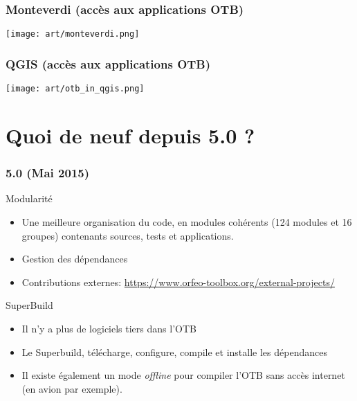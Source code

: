 \documentclass[8pt]{beamer}
\begin{document}
\begin{frame}
\frametitle{Monteverdi (accès aux applications OTB)}
\begin{minipage}[t][6cm][t]{\textwidth}
\begin{center}
\texttt{[image: art/monteverdi.png]}
\end{center}
\end{minipage}
\end{frame}

\begin{frame}
  \frametitle{QGIS (accès aux applications OTB)}
\begin{minipage}[t][6cm][t]{\textwidth}
\begin{center}
\texttt{[image: art/otb\_in\_qgis.png]}
\end{center}
\end{minipage}
\end{frame}

\section{Quoi de neuf depuis 5.0 ?}

\begin{frame}
\frametitle{5.0 (Mai 2015)}
\begin{block}{Modularité}
\begin{itemize}
\item Une meilleure organisation du code, en modules cohérents (124 modules et
    16 groupes) contenants sources, tests et applications.
\item Gestion des dépendances
\item Contributions externes: \url{https://www.orfeo-toolbox.org/external-projects/}
\end{itemize}
\end{block}

\begin{block}{SuperBuild}
\begin{itemize}
\item Il n'y a plus de logiciels tiers dans l'OTB
\item Le Superbuild, télécharge, configure, compile et installe les dépendances
\item Il existe également un mode \textit{offline} pour compiler l'OTB sans
  accès internet (en avion par exemple).
\end{itemize}
\end{block}
\end{frame}
\end{document}
